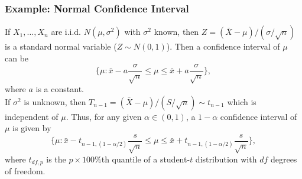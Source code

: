 \documentclass{beamer}
\begin{document}
\begin{frame}
\frametitle{Example: Normal Confidence Interval}
If $X_1,\ldots,X_n$ are i.i.d. $N(\mu,\sigma^2)$ with $\sigma^2$ known, then $Z=(\bar{X}-\mu)/(\sigma/\sqrt{n})$ is a standard normal variable ($Z \sim N(0,1)$). Then a confidence interval of $\mu$ can be
$$
\{\mu: \bar{x}-a\frac{\sigma}{\sqrt{n}} \leq \mu \leq \bar{x}+a\frac{\sigma}{\sqrt{n}}\},
$$
where $a$ is a constant. \\
If $\sigma^2$ is unknown, then $T_{n-1}=(\bar{X}-\mu)/(S/\sqrt{n}) \sim t_{n-1}$ which is independent of $\mu$. Thus, for any given $\alpha \in (0,1)$, a $1-\alpha$ confidence interval of $\mu$ is given by
$$
\{\mu: \bar{x}-t_{n-1,(1-\alpha/2)}\frac{s}{\sqrt{n}} \leq \mu \leq \bar{x}+t_{n-1,(1-\alpha/2)}\frac{s}{\sqrt{n}}\},
$$
where $t_{df,p}$ is the $p\times 100\%$th quantile of a student-$t$ distribution with $df$ degrees of freedom.
\end{frame}
\end{document}

